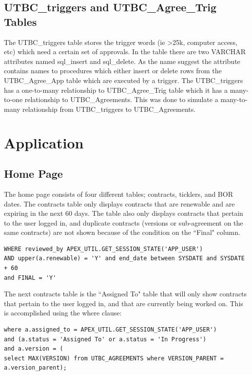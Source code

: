\documentclass{report}
\begin{document}
\section{UTBC\_triggers and UTBC\_Agree\_Trig Tables}
The UTBC\_triggers table stores the trigger words (ie  >25k, computer access, etc) which need a certain set of approvals. In the table there are two VARCHAR attributes named sql\_insert and sql\_delete. As the name suggest the attribute contains names to procedures which either insert or delete rows from the UTBC\_Agree\_App table which are executed by a trigger. The UTBC\_triggers has a one-to-many relationship to UTBC\_Agree\_Trig table which it has a many-to-one relationship to UTBC\_Agreements. This was done to simulate a many-to-many relationship from UTBC\_triggers to UTBC\_Agreements. 

\chapter{Application}

\section{Home Page}
The home page consists of four different tables; contracts, ticklers, and BOR dates. The contracts table only displays contracts that are renewable and are expiring in the next 60 days. The table also only displays contracts that pertain to the user logged in, and duplicate contracts (versions or sub-agreement on the same contracts) are not shown because of the condition on the ``Final" column.

\begin{lstlisting}[caption=Contracts table where clause for user]
WHERE reviewed_by APEX_UTIL.GET_SESSION_STATE('APP_USER')
AND upper(a.renewable) = 'Y' and end_date between SYSDATE and SYSDATE + 60
and FINAL = 'Y'
\end{lstlisting}

The next contracts table is the ``Assigned To" table that will only show contracts that pertain to the user logged in, and that are currently being worked on. This is accomplished using the where clause:

\begin{lstlisting}
where a.assigned_to = APEX_UTIL.GET_SESSION_STATE('APP_USER') 
and (a.status = 'Assigned To' or a.status = 'In Progress')
and a.version = (
select MAX(VERSION) from UTBC_AGREEMENTS where VERSION_PARENT = a.version_parent);
\end{lstlisting}
\end{document}
